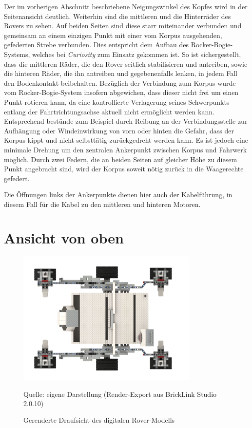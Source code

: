 Der im vorherigen Abschnitt beschriebene Neigungswinkel des Kopfes wird in der Seitenansicht deutlich.
Weiterhin sind die mittleren und die Hinterräder des Rovers zu sehen.
Auf beiden Seiten sind diese starr miteinander verbunden und gemeinsam an einem einzigen Punkt mit einer vom Korpus ausgehenden, gefederten Strebe verbunden.
Dies entspricht dem Aufbau des Rocker-Bogie-Systems, welches bei \textit{Curiosity} zum Einsatz gekommen ist.
So ist sichergestellt, dass die mittleren Räder, die den Rover seitlich stabilisieren und antreiben, sowie die hinteren Räder, die ihn antreiben und gegebenenfalls lenken, in jedem Fall den Bodenkontakt beibehalten.
Bezüglich der Verbindung zum Korpus wurde vom Rocker-Bogie-System insofern abgewichen, dass dieser nicht frei um einen Punkt rotieren kann, da eine kontrollierte Verlagerung seines Schwerpunkts entlang der Fahrtrichtungsachse aktuell nicht ermöglicht werden kann.
Entsprechend bestünde zum Beispiel durch Reibung an der Verbindungsstelle zur Aufhängung oder Windeinwirkung von vorn oder hinten die Gefahr, dass der Korpus kippt und nicht selbsttätig zurückgedreht werden kann.
Es ist jedoch eine minimale Drehung um den zentralen Ankerpunkt zwischen Korpus und Fahrwerk möglich. 
Durch zwei Federn, die an beiden Seiten auf gleicher Höhe zu diesem Punkt angebracht sind, wird der Korpus soweit nötig zurück in die Waagerechte gefedert.

Die Öffnungen links der Ankerpunkte dienen hier auch der Kabelführung, in diesem Fall für die Kabel zu den mittleren und hinteren Motoren.

\section{Ansicht von oben}
\label{sec:draufsicht}

\begin{figure}
	\centering
	\includegraphics[width=0.8\textwidth]{../Images/20200429_Mars_Rover_V5_top.png}
	\vspace{0.5em}
	\parbox[c]{0.8\linewidth}{\footnotesize
		\centering
		\vspace{1em}
		Quelle: eigene Darstellung (Render-Export aus BrickLink Studio 2.0.10)
	}
	\caption{Gerenderte Draufsicht des digitalen Rover-Modells}
	\label{fig:rovertoprender}
\end{figure}


